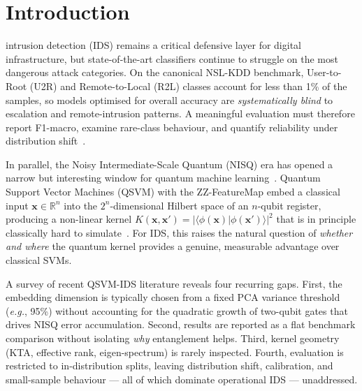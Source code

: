 \documentclass[journal]{IEEEtran}
\newcommand{\ZZ}{\textsc{ZZ}}
\begin{document}
  \section{Introduction}
   intrusion detection (IDS) remains a critical
  defensive layer for digital infrastructure, but state-of-the-art
  classifiers continue to struggle on the most dangerous attack
  categories. On the canonical NSL-KDD benchmark, User-to-Root (U2R) and
  Remote-to-Local (R2L) classes account for less than 1\% of the
  samples, so models optimised for overall accuracy are
  \emph{systematically blind} to escalation and remote-intrusion
  patterns. A meaningful evaluation must therefore report
  F1-macro, examine rare-class behaviour, and quantify reliability
  under distribution shift~\cite{tavallaee2009nslkdd,moustafa2015unsw}.

  In parallel, the Noisy Intermediate-Scale Quantum (NISQ) era has
  opened a narrow but interesting window for quantum machine
  learning~\cite{preskill2018nisq,havlicek2019,schuld2019hilbert}.
  Quantum Support Vector Machines (QSVM) with the \ZZ{}-FeatureMap embed
  a classical input $\mathbf{x}\in\mathbb{R}^n$ into the
  $2^n$-dimensional Hilbert space of an $n$-qubit register, producing a
  non-linear kernel $K(\mathbf{x},\mathbf{x}')=|\langle\phi(\mathbf{x})
  |\phi(\mathbf{x}')\rangle|^2$ that is in principle classically hard to
  simulate~\cite{liu2021speedup,schuld2021effect}. For IDS, this raises
  the natural question of \emph{whether and where} the quantum kernel
  provides a genuine, measurable advantage over classical SVMs.

  A survey of recent QSVM-IDS literature reveals four recurring gaps.
  First, the embedding dimension is typically chosen from a fixed PCA
  variance threshold (\emph{e.g.}, 95\%) without accounting for the
  quadratic growth of two-qubit gates that drives NISQ error
  accumulation. Second, results are reported as a flat benchmark
  comparison without isolating \emph{why} entanglement helps. Third,
  kernel geometry (KTA, effective rank, eigen-spectrum) is rarely
  inspected. Fourth, evaluation is restricted to in-distribution
  splits, leaving distribution shift, calibration, and small-sample
  behaviour --- all of which dominate operational IDS --- unaddressed.
\end{document}
